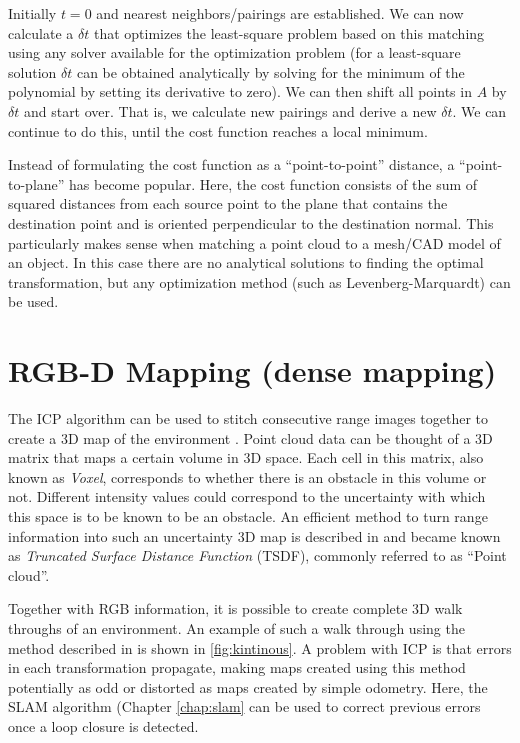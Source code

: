 Initially $t=0$ and nearest neighbors/pairings are established. We can now calculate a $ \delta t$ that optimizes the least-square problem based on this matching using any solver available for the optimization problem (for a least-square solution $ \delta t$ can be obtained analytically by solving for the minimum of the polynomial by setting its derivative to zero). We can then shift all points in $ A$ by $ \delta t$ and start over. That is, we calculate new pairings and derive a new $ \delta t$.  We can continue to do this, until the cost function reaches a local minimum.

Instead of formulating the cost function as a ``point-to-point'' distance, a ``point-to-plane'' has become popular. Here, the cost function consists of the sum of squared distances from each source point to the plane that contains the destination point and is oriented perpendicular to the destination normal. This particularly makes sense when matching a point cloud to a mesh/CAD model of an object. In this case there are no analytical solutions to finding the optimal transformation, but any optimization method (such as Levenberg-Marquardt) can be used.

\section{RGB-D Mapping (dense mapping)}\label{sec:densemapping}
The ICP algorithm can be used to stitch consecutive range images together to create a 3D map of the environment \cite{henry2010rgb}. Point cloud data can be thought of a 3D matrix that maps a certain volume in 3D space. Each cell in this matrix, also known as \emph{Voxel}, corresponds to whether there is an obstacle in this volume or not. Different intensity values could correspond to the uncertainty with which this space is to be known to be an obstacle. An efficient method to turn range information into such an uncertainty 3D map is described in \cite{curless96} and became known as \emph{Truncated Surface Distance Function} (TSDF), commonly referred to as ``Point cloud''.

Together with RGB information, it is possible to create complete 3D walk throughs of an environment. An example of such a walk through using the method described in \cite{whelan2013robust} is shown in \cref{fig:kintinous}.
A problem with ICP is that errors in each transformation propagate, making maps created using this method potentially as odd or distorted as maps created by simple odometry. Here, the SLAM algorithm (Chapter \ref{chap:slam} can be used to correct previous errors once a loop closure is detected.

